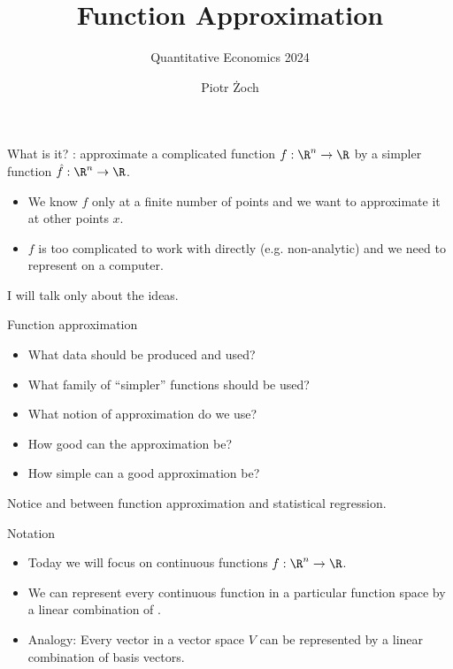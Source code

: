 \documentclass[11pt,xcolor={dvipsnames},aspectratio=159,hyperref={pdftex,pdfpagemode=UseNone,hidelinks,pdfdisplaydoctitle=true},usepdftitle=false]{beamer}
\begin{document}
\title{Function Approximation}
\subtitle{Quantitative Economics 2024}

\author{Piotr Żoch}%
\frame{\titlepage}

\begin{frame}{What is it?}   
    : approximate a complicated function $f: \R^n \rightarrow \R$ by a simpler function $\hat{f}: \R^n \rightarrow \R$.
\begin{itemize}
    \item We know $f$ only at a finite number of points and we want to approximate it at other points $x$.
    \item $f$ is too complicated to work with directly (e.g. non-analytic) and we need to represent on a computer.
\end{itemize}

I will talk only about the  ideas. 

\end{frame}
\begin{frame}{Function approximation}   
\begin{itemize}
    \item  What data should be produced and used?
    \item  What family of “simpler” functions should be used?
    \item  What notion of approximation do we use?
    \item  How good can the approximation be?
    \item  How simple can a good approximation be?
\end{itemize}

Notice  and  between function approximation and statistical regression.

\end{frame}

\begin{frame}{Notation}   
    \begin{itemize} 
      \item Today we will focus on continuous functions $f: \R^n \rightarrow \R$.
      \item  We can represent every continuous function in a particular function space
      by a linear combination of .
      \item  Analogy: Every vector in a vector space $V$ can be represented by a linear combination of basis vectors.
     \end{itemize}
\end{frame}
\end{document}
